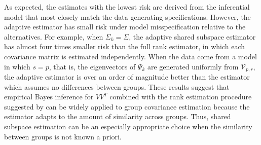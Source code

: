 \documentclass{statsoc}
\begin{document}
As expected, the estimates with the lowest risk are derived from the
inferential model that most closely match the data generating
specifications. However, the adaptive estimator has small risk under
model misspecification relative to the alternatives.  For example,
when $\Sigma_k = \Sigma$, the adaptive shared subspace estimator has
almost four times smaller risk than the full rank estimator, in which
each covariance matrix is estimated independently.  When the
data come from a model in which $s=p$, that is, the eigenvectors of $\Psi_k$
are generated uniformly from $\mathcal{V}_{p,r}$, the adaptive
estimator is over an order of magnitude better than the estimator
which assumes no differences between groups.  These results suggest
that empirical Bayes inference for $VV^T$ combined with the rank
estimation procedure suggested by \citet{Gavish2014} can be widely
applied to group covariance estimation because the estimator adapts to
the amount of similarity across groups.  Thus, shared subspace estimation
can be an especially appropriate choice when the similarity between
groups is not known a priori.  %


\end{document}
